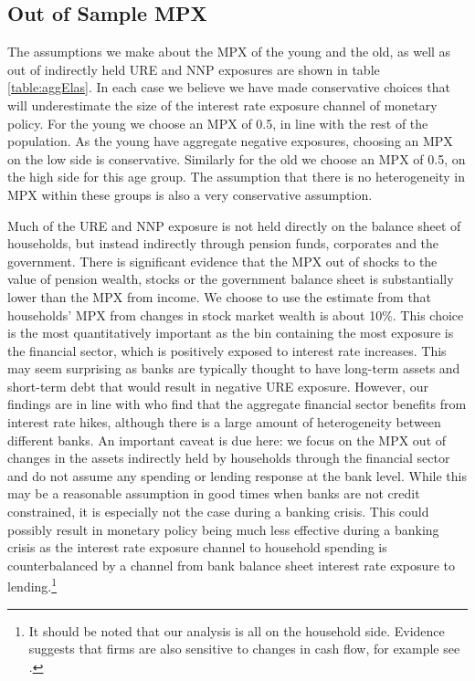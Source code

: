 \documentclass[titlepage]{\econtex}\newcommand{\texname}{ConsumptionHeterogeneity}
\begin{document}
\subsection{Out of Sample MPX}
The assumptions we make about the MPX of the young and the old, as well as out of indirectly held URE and NNP exposures are shown in table \ref{table:aggElas}. In each case we believe we have made conservative choices that will underestimate the size of the interest rate exposure channel of monetary policy. For the young we choose an MPX of 0.5, in line with the rest of the population. As the young have aggregate negative exposures, choosing an MPX on the low side is conservative. Similarly for the old we choose an MPX of 0.5, on the high side for this age group. The assumption that there is no heterogeneity in MPX within these groups is also a very conservative assumption.

Much of the URE and NNP exposure is not held directly on the balance sheet of households, but instead indirectly through pension funds, corporates and the government. There is significant evidence that the MPX out of shocks to the value of pension wealth, stocks or the government balance sheet is substantially lower than the MPX from income. We choose to use the estimate from \cite{maggio_stock_2018} that households' MPX from changes in stock market wealth is about 10\%. This choice is the most quantitatively important as the bin containing the most exposure is the financial sector, which is positively exposed to interest rate increases. This may seem surprising as banks are typically thought to have long-term assets and short-term debt that would result in negative URE exposure. However, our findings are in line with \cite{landier_banks_2013} who find that the aggregate financial sector benefits from interest rate hikes, although there is a large amount of heterogeneity between different banks. An important caveat is due here: we focus on the MPX out of changes in the assets indirectly held by households through the financial sector and do not assume any spending or lending response at the bank level. While this may be a reasonable assumption in good times when banks are not credit constrained, it is especially not the case during a banking crisis. This could possibly result in monetary policy being much less effective during a banking crisis as the interest rate exposure channel to household spending is counterbalanced by a channel from bank balance sheet interest rate exposure to lending.\footnote{It should be noted that our analysis is all on the household side. Evidence suggests that firms are also sensitive to changes in cash flow, for example see \cite{blanchard_what_1994}.} 
\end{document}

